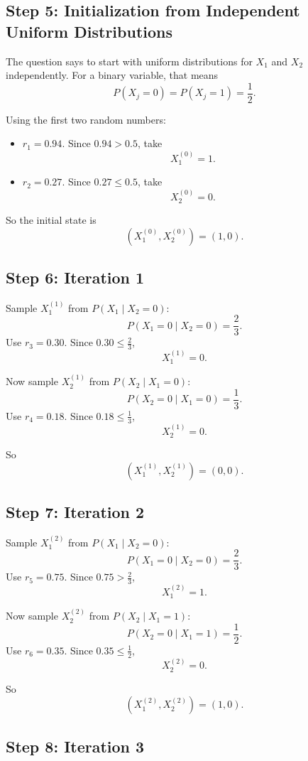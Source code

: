 \documentclass[11pt]{article}
\begin{document}
\subsection*{Step 5: Initialization from Independent Uniform Distributions}

The question says to start with uniform distributions for \(X_1\) and \(X_2\)
independently. For a binary variable, that means
\[
    P(X_j=0)=P(X_j=1)=\frac12.
\]

Using the first two random numbers:
\begin{itemize}
    \item \(r_1=0.94\). Since \(0.94>0.5\), take
    \[
        X_1^{(0)}=1.
    \]
    \item \(r_2=0.27\). Since \(0.27\le 0.5\), take
    \[
        X_2^{(0)}=0.
    \]
\end{itemize}

So the initial state is
\[
    (X_1^{(0)},X_2^{(0)})=(1,0).
\]

\subsection*{Step 6: Iteration 1}

Sample \(X_1^{(1)}\) from \(P(X_1\mid X_2=0)\):
\[
    P(X_1=0\mid X_2=0)=\frac23.
\]
Use \(r_3=0.30\). Since \(0.30\le \frac23\),
\[
    X_1^{(1)}=0.
\]

Now sample \(X_2^{(1)}\) from \(P(X_2\mid X_1=0)\):
\[
    P(X_2=0\mid X_1=0)=\frac13.
\]
Use \(r_4=0.18\). Since \(0.18\le \frac13\),
\[
    X_2^{(1)}=0.
\]

So
\[
    (X_1^{(1)},X_2^{(1)})=(0,0).
\]

\subsection*{Step 7: Iteration 2}

Sample \(X_1^{(2)}\) from \(P(X_1\mid X_2=0)\):
\[
    P(X_1=0\mid X_2=0)=\frac23.
\]
Use \(r_5=0.75\). Since \(0.75>\frac23\),
\[
    X_1^{(2)}=1.
\]

Now sample \(X_2^{(2)}\) from \(P(X_2\mid X_1=1)\):
\[
    P(X_2=0\mid X_1=1)=\frac12.
\]
Use \(r_6=0.35\). Since \(0.35\le \frac12\),
\[
    X_2^{(2)}=0.
\]

So
\[
    (X_1^{(2)},X_2^{(2)})=(1,0).
\]

\subsection*{Step 8: Iteration 3}
\end{document}
